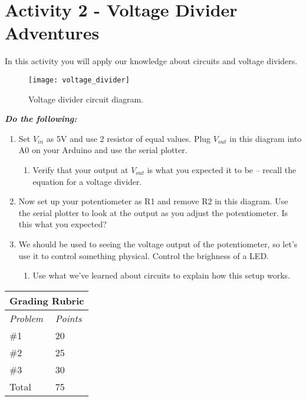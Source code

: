 \documentclass[10pt]{article}
\begin{document}
 \clearpage
 
 
 
\section*{Activity 2 -  Voltage Divider Adventures}

In this activity you will apply our knowledge about circuits and voltage dividers. \\

\begin{figure}[ht]
	\centering
	\texttt{[image: voltage\_divider]}
	\caption{Voltage divider circuit diagram.}
	\label{fig:stoplight_wiring_diagram}
	
\end{figure}

\noindent\textbf{\textit{Do the following:}}
\begin{enumerate}
	\item Set $ V_{in} $ as 5V and use 2 resistor of equal values. Plug $ V_{out} $ in this diagram into A0 on your Arduino and use the serial plotter.
	\begin{enumerate}
		\item Verify that your output at $ V_{out} $ is what you expected it to be -- recall the equation for a voltage divider. 
	\end{enumerate}
	\item Now set up your potentiometer as R1 and remove R2 in this diagram. Use the serial plotter to look at the output as you adjust the potentiometer. Is this what you expected?
	\item We should be used to seeing the voltage output of the potentiometer, so let's use it to control something physical. Control the brighness of a LED. 
	\begin{enumerate}
		\item Use what we've learned about circuits to explain how this setup works. 
	\end{enumerate}
\end{enumerate}

\begin{table}[h!]
	\footnotesize
	\centering
	\begin{tabular}{@{}ll@{}}
		\multicolumn{2}{c}{\textbf{Grading Rubric}} \\ \midrule 
		\multicolumn{1}{l}{\textit{Problem}}   & \textit{Points}   \\ \midrule 
		\#1                    & 20       \\ \midrule
		\#2            & 25       \\ \midrule
		\#3            & 30       \\ \midrule
		Total                            & 75       \\ \bottomrule
	\end{tabular}
\end{table}
\end{document}
